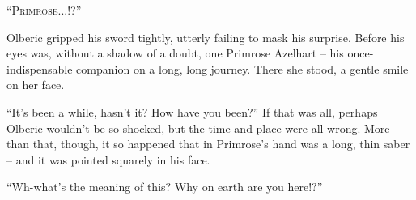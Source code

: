 \textsc{``Primrose...!?''} 

Olberic gripped his sword tightly, utterly failing to mask his surprise. Before his eyes was, without a shadow of a doubt, one Primrose Azelhart -- his once-indispensable companion on a long, long journey. There she stood, a gentle smile on her face.

``It's been a while, hasn't it? How have you been?'' If that was all, perhaps Olberic wouldn't be so shocked, but the time and place were all wrong. More than that, though, it so happened that in Primrose's hand was a long, thin saber -- and it was pointed squarely in his face.

``Wh-what's the meaning of this? Why on earth are you here!?''